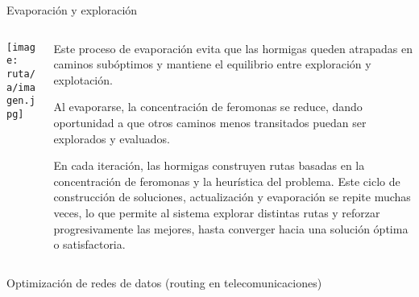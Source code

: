 \documentclass{beamer}
\begin{document}
\begin{frame}{Evaporación y exploración}
\begin{columns}
    \begin{column}{0.35\textwidth}
        \centering
        \texttt{[image: ruta/a/imagen.jpg]} %
    \end{column}
    \begin{column}{0.65\textwidth}
        \justifying
        Este proceso de evaporación evita que las hormigas queden atrapadas en caminos subóptimos y mantiene el equilibrio entre exploración y explotación.  

        Al evaporarse, la concentración de feromonas se reduce, dando oportunidad a que otros caminos menos transitados puedan ser explorados y evaluados.  

        En cada iteración, las hormigas construyen rutas basadas en la concentración de feromonas y la heurística del problema. Este ciclo de construcción de soluciones, actualización y evaporación se repite muchas veces, lo que permite al sistema explorar distintas rutas y reforzar progresivamente las mejores, hasta converger hacia una solución óptima o satisfactoria.
    \end{column}
\end{columns}
\end{frame}















\begin{frame}{Optimización de redes de datos (routing en telecomunicaciones)}
\end{frame}
\end{document}
